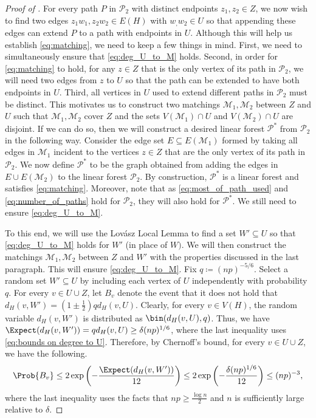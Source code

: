 \documentclass[10pt,a4paper,reqno]{amsart}
\begin{document}
\begin{proof}[Proof of ]
For every path $P$ in $\mathcal{P}_2$ with distinct endpoints $z_1,z_2\in Z$, we now wish to find two edges $z_1w_1, z_2w_2\in E(H)$ with $w_, w_2\in U$ so that appending these edges can extend $P$ to a path with endpoints in $U$. Although this will help us establish \ref{eq:matching}, we need to keep a few things in mind. First, we need to simultaneously ensure that \ref{eq:deg_U_to_M} holds. Second, in order for \ref{eq:matching} to hold, for any $z \in Z$ that is the only vertex of its path in $\mathcal{P}_2$, we will need two edges from $z$ to $U$ so that the path can be extended to have both endpoints in $U$. Third, all vertices in $U$ used to extend different paths in $\mathcal{P}_2$ must be distinct. This motivates us to construct two matchings $\mathcal{M}_1, \mathcal{M}_2$ between $Z$ and $U$ such that $\mathcal{M}_1, \mathcal{M}_2$ cover $Z$ and the sets $V(\mathcal{M}_1)\cap U$ and $V(\mathcal{M}_2)\cap U$ are disjoint. If we can do so, then we will construct a desired linear forest $\mathcal{P}^*$ from $\mathcal{P}_2$ in the following way. Consider the edge set $E\subseteq E(\mathcal{M}_1)$ formed by taking all edges in $\mathcal{M}_1$ incident to the vertices $z\in Z$ that are the only vertex of its path in $\mathcal{P}_2$. We now define $\mathcal{P}^*$ to be the graph obtained from adding the edges in $E\cup E(\mathcal{M}_2)$ to the linear forest $\mathcal{P}_2$. By construction, $\mathcal{P}^*$ is a linear forest and satisfies \ref{eq:matching}.
Moreover, note that as \ref{eq:most_of_path_used} and \ref{eq:number_of_paths} hold for $\mathcal{P}_2$, they will also hold for $\mathcal{P}^*$. We still need to ensure \ref{eq:deg_U_to_M}.

To this end, we will use the Lov\'asz Local Lemma to find a set $W'\subseteq U$ so that \ref{eq:deg_U_to_M} holds for $W'$ (in place of $W)$. We will then construct the matchings $\mathcal{M}_1, \mathcal{M}_2$ between $Z$ and $W'$ with the properties discussed in the last paragraph. This will ensure \ref{eq:deg_U_to_M}. Fix $q \coloneqq (np)^{-5/6}$. Select a random set $W' \subseteq U$ by including each vertex of $U$ independently with probability $q$. For every $v\in U\cup Z$, let $B_v$ denote the event that it does not hold that $d_H(v,W') = (1\pm \frac{1}{2})qd_H(v,U)$. Clearly, for every $v\in V(H)$, the random variable $d_H(v,W')$ is distributed as $\bin(d_H(v,U),q)$. Thus, we have $\Expect(d_H(v,W'))= qd_H(v,U)\ge \delta (np)^{1/6} $,  where the last inequality uses \eqref{eq:bounds on degree to U}. Therefore, by Chernoff's bound, for every $v\in U\cup Z$, we have the following.
\begin{align*}
    \Prob{B_v} \le 2\exp\left(-\frac{\Expect(d_H(v,W'))}{12}\right) \le 2\exp\left(-\frac{\delta(np)^{1/6}}{12}\right) \le (np)^{-3},
\end{align*}
where the last inequality uses the facts that $np \ge \frac{\log{n}}{2}$ and $n$ is sufficiently large relative to $\delta$.


\end{proof}
\end{document}
